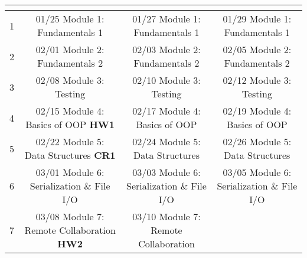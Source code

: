 \documentclass[11pt]{article}
\begin{document}
\begin{tabular}{| r | c | c | c |}
	\hline
	\cellcolor{gray!40} \colorbox{gray!40}{\makecell{Week}} &
	\cellcolor{gray!40} \colorbox{gray!40}{\makecell{Monday}} &
	\cellcolor{gray!40} \colorbox{gray!40}{\makecell{Wednesday}} &
	\cellcolor{gray!40} \colorbox{gray!40}{\makecell{Friday}} \\
	\hline 1 & 
	\makecell{01/25 Module 1:\\Fundamentals 1} & 
	\makecell{01/27 Module 1:\\Fundamentals 1} & 
	\makecell{01/29 Module 1:\\Fundamentals 1} \\
	\hline 2 & 
	\makecell{02/01 Module 2:\\Fundamentals 2} &
	\makecell{02/03 Module 2:\\Fundamentals 2} & 
	\makecell{02/05 Module 2:\\Fundamentals 2} \\
	\hline 3 & 
	\makecell{02/08 Module 3:\\Testing} & 
	\makecell{02/10 Module 3:\\Testing} & 
	\makecell{02/12 Module 3:\\Testing} \\
	\hline 4 & 
	\makecell{02/15 Module 4:\\Basics of OOP \textbf{HW1}} & 
	\makecell{02/17 Module 4:\\Basics of OOP} &
	\makecell{02/19 Module 4:\\Basics of OOP} \\
	\hline 5 &
	\makecell{02/22 Module 5:\\Data Structures \textbf{CR1}} &
	\makecell{02/24 Module 5:\\Data Structures} &
	\makecell{02/26 Module 5:\\Data Structures} \\
	\hline 6 &
	\makecell{03/01 Module 6:\\Serialization \& File I/O} &
	\makecell{03/03 Module 6:\\Serialization \& File I/O} &
	\makecell{03/05 Module 6:\\Serialization \& File I/O} \\
	\hline 7 &	
	\makecell{03/08 Module 7:\\Remote Collaboration \textbf{HW2}} &
	\makecell{03/10 Module 7:\\Remote Collaboration} &

\end{tabular}
\end{document}
